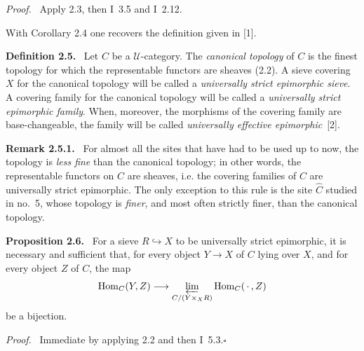 \documentclass[11pt]{article}
\newcommand{\U}{\mathcal{U}}
\newcommand{\Hom}{\operatorname{Hom}}
\newcommand{\qedtext}{\hfill\(\square\)}
\newenvironment{statement}[1]{\par\medskip\noindent\textbf{#1.}\ }{\par\medskip}
\newenvironment{remarktext}[1]{\par\medskip\noindent\textbf{#1.}\ }{\par\medskip}
\newenvironment{prooftext}{\par\noindent\emph{Proof.}\ }{\par\medskip}
\begin{document}
\begin{prooftext}
Apply 2.3, then I~3.5 and I~2.12.

With Corollary 2.4 one recovers the definition given in [1].
\end{prooftext}

\begin{statement}{Definition 2.5}
Let \(C\) be a \(\U\)-category. The \emph{canonical topology} of \(C\) is the finest topology for which the representable functors are sheaves (2.2). A sieve covering \(X\) for the canonical topology will be called a \emph{universally strict epimorphic sieve}. A covering family for the canonical topology will be called a \emph{universally strict epimorphic family}. When, moreover, the morphisms of the covering family are base-changeable, the family will be called \emph{universally effective epimorphic}~[2].
\end{statement}

\begin{remarktext}{Remark 2.5.1}
For almost all the sites that have had to be used up to now, the topology is \emph{less fine} than the canonical topology; in other words, the representable functors on \(C\) are sheaves, i.e. the covering families of \(C\) are universally strict epimorphic. The only exception to this rule is the site \(\widehat{C}\) studied in no.~5, whose topology is \emph{finer}, and most often strictly finer, than the canonical topology.
\end{remarktext}

\begin{statement}{Proposition 2.6}
For a sieve \(R\hookrightarrow X\) to be universally strict epimorphic, it is necessary and sufficient that, for every object \(Y\to X\) of \(C\) lying over \(X\), and for every object \(Z\) of \(C\), the map
\[
\Hom_C(Y,Z)\longrightarrow \varprojlim_{C/(Y\times_XR)}\Hom_C(\,\cdot\,,Z)
\]
be a bijection.
\end{statement}

\begin{prooftext}
Immediate by applying 2.2 and then I~5.3.\qedtext
\end{prooftext}
\end{document}
